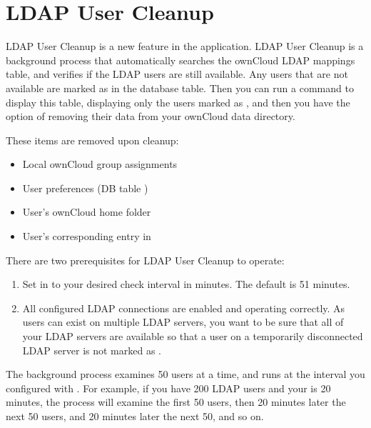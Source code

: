 \documentclass[letterpaper,10pt,english]{sphinxmanual}
\begin{document}
\section{LDAP User Cleanup}
\label{configuration_user/user_auth_ldap_cleanup:ldap-user-cleanup}\label{configuration_user/user_auth_ldap_cleanup::doc}
LDAP User Cleanup is a new feature in the 
application. LDAP User Cleanup is a background process that automatically
searches the ownCloud LDAP mappings table, and verifies if the LDAP users are
still available. Any users that are not available are marked as  in
the  database table. Then you can run a command to display
this table, displaying only the users marked as , and then you have
the option of removing their data from your ownCloud data directory.

These items are removed upon cleanup:
\begin{itemize}
\item {} 
Local ownCloud group assignments

\item {} 
User preferences (DB table )

\item {} 
User's ownCloud home folder

\item {} 
User's corresponding entry in 

\end{itemize}

There are two prerequisites for LDAP User Cleanup to operate:
\begin{enumerate}
\item {} 
Set  in  to your desired check
interval in minutes. The default is 51 minutes.

\item {} 
All configured LDAP connections are enabled and operating correctly. As users
can exist on multiple LDAP servers, you want to be sure that all of your
LDAP servers are available so that a user on a temporarily disconnected LDAP
server is not marked as .

\end{enumerate}

The background process examines 50 users at a time, and runs at the interval you
configured with . For example, if you have 200 LDAP
users and your  is 20 minutes, the process will
examine the first 50 users, then 20 minutes later the next 50 users, and 20
minutes later the next 50, and so on.
\end{document}
